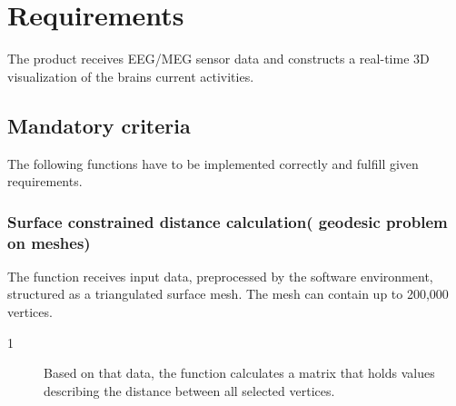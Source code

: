 \section{Requirements}
The product receives EEG/MEG sensor data and constructs a real-time 3D visualization of the brains current activities.

\subsection{Mandatory criteria}
The following functions have to be implemented correctly and fulfill given requirements.
\subsubsection{Surface constrained distance calculation( geodesic problem on meshes)}
The function receives input data, preprocessed by the software environment, structured as a triangulated surface mesh.%
 The mesh can contain up to 200,000 vertices.
\begin{description}
	\item[1] Based on that data, the function calculates a matrix that holds values describing the distance between all selected vertices. 
\end{description}
